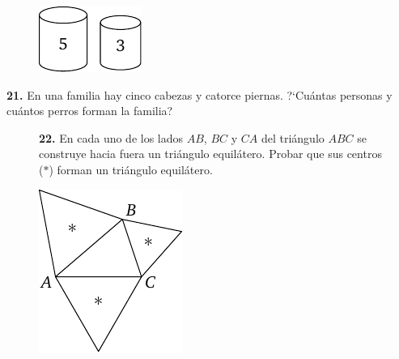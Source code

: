 \documentclass[12pt, spanish]{article}  %
\begin{document}
\begin{figure}[h!]
\centering
\footnotesize
\includegraphics[scale=1]{taskbook-4}
\end{figure}

\medskip\noindent
{\bf 21.} En una familia hay cinco cabezas y catorce piernas. ?`Cu\'antas personas y cu\'antos perros forman la familia?
\begin{figure}[h!]
\begin{minipage}[c][][c]{0.7 \textwidth}
{\bf 22.} En cada uno de los lados $AB$, $BC$ y $CA$ del tri\'angulo $ABC$ se construye hacia fuera un tri\'angulo equil\'atero.
Probar que sus centros ($*$) forman un tri\'angulo equil\'atero.\end{minipage}
\hfill
\begin{minipage}[c]{0.2 \textwidth}
\includegraphics[scale=1]{taskbook-6}
\end{minipage}
\end{figure}

\end{document}
